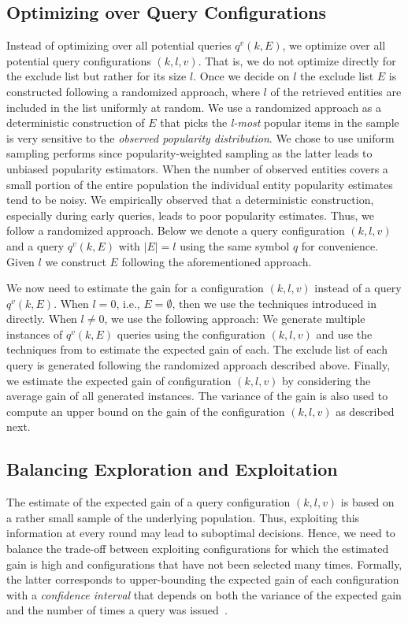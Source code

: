 \subsection{Optimizing over Query Configurations}
\label{sec:config}
Instead of optimizing over all potential queries $q^v(k,E)$, we optimize over all potential query configurations $(k,l,v)$. That is, we do not optimize directly for the exclude list but rather for its size $l$. Once we decide on $l$ the exclude list $E$ is constructed following a randomized approach, where $l$ of the retrieved entities are included in the list uniformly at random. We use a randomized approach as a deterministic construction of $E$ that picks the {\em l-most} popular items in the sample is very sensitive to the {\em observed popularity distribution}. We chose to use uniform sampling performs since popularity-weighted sampling as the latter leads to unbiased popularity estimators. When the number of observed entities covers a small portion of the entire population the individual entity popularity estimates tend to be noisy. We empirically observed that a deterministic construction, especially during early queries, leads to poor popularity estimates. Thus, we follow a randomized approach. Below we denote a query configuration $(k,l,v)$ and a query $q^v(k,E)$ with $|E| = l$ using the same symbol $q$ for convenience. Given $l$ we construct $E$ following the aforementioned approach.

We now need to estimate the gain for a configuration $(k,l,v)$ instead of a query $q^v(k,E)$. When $l = 0$, i.e., $E = \emptyset$, then we use the techniques introduced in  directly. When $l \neq 0$, we use the following approach: We generate multiple instances of $q^v(k,E)$ queries using the configuration $(k,l,v)$ and use the techniques from  to estimate the expected gain of each. The exclude list of each query is generated following the randomized approach described above. Finally, we estimate the expected gain of configuration $(k,l,v)$ by considering the average gain of all generated instances. The variance of the gain is also used to compute an upper bound on the gain of the configuration $(k,l,v)$ as described next.

\subsection{Balancing Exploration and Exploitation}
\label{sec:balancing}
The estimate of the expected gain of a query configuration $(k,l,v)$ is based on a rather small sample of the underlying population. Thus, exploiting this information at every round may lead to suboptimal decisions. Hence, we need to balance the trade-off between exploiting configurations for which the estimated gain is high and configurations that have not been selected many times. Formally, the latter corresponds to upper-bounding the expected gain of each configuration with a {\em confidence interval} that depends on both the variance of the expected gain and the number of times a query was issued~\cite{Auer:2003}.

